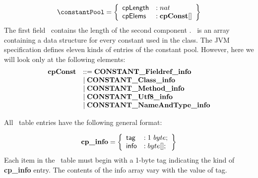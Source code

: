 $$ 
\begin{array}{l}
         \constantPool = \left\{\begin{array}{ll} \cpLength    & :   nat \\
                                                  \cpElems   & :   \classConst [ ]
	                        \end{array} \right\}
   \end{array} 
$$
The first field \cpLength \  contains the length of the second component \cpElems. \cpElems \
is an array containing a data structure for every constant used in the class. The JVM specification defines
eleven kinds of entries of the constant pool.
However, here we will look only at the following elements:
$$ \begin{array}{ll}\mbox{\rm\textbf{cpConst}} & ::=   \mbox{\rm\textbf{CONSTANT\_Fieldref\_info}} \\
		     & \mid \mbox{\rm\textbf{CONSTANT\_Class\_info}} \\
		     & \mid \mbox{\rm\textbf{CONSTANT\_Method\_info}}\\
		      & \mid \mbox{\rm \textbf{CONSTANT\_Utf8\_info}} \\
		      & \mid \mbox{\rm \textbf{CONSTANT\_NameAndType\_info}}
                    \end{array}$$

All \constantPool \ table entries have the following general format:


   $$ 
     \mbox{\rm\textbf{cp\_info}} =  \left\{\begin{array}{ll} 
    \mbox{\rm\textsf{tag}} & : 1 \  byte; \\ 	
       \mbox{\rm\textsf{info}} & : byte[];
    \end{array} \right\} 
   $$
Each item in the \constantPool \  table must begin with a 1-byte tag indicating the kind of \textbf{cp\_info} entry. 
The contents of the info array vary with the value of tag.


